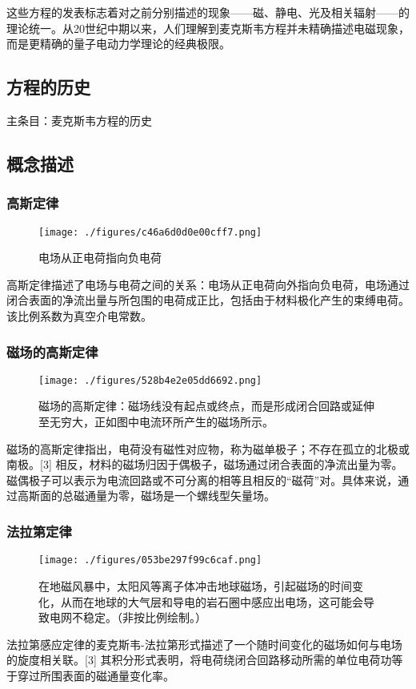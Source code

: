 这些方程的发表标志着对之前分别描述的现象——磁、静电、光及相关辐射——的理论统一。从20世纪中期以来，人们理解到麦克斯韦方程并未精确描述电磁现象，而是更精确的量子电动力学理论的经典极限。
\subsection{方程的历史}  
主条目：麦克斯韦方程的历史
\subsection{概念描述} 
\subsubsection{高斯定律} 
\begin{figure}[ht]
\centering
\texttt{[image: ./figures/c46a6d0d0e00cff7.png]}
\caption{电场从正电荷指向负电荷} \label{fig_MAXS_2}
\end{figure}
高斯定律描述了电场与电荷之间的关系：电场从正电荷向外指向负电荷，电场通过闭合表面的净流出量与所包围的电荷成正比，包括由于材料极化产生的束缚电荷。该比例系数为真空介电常数。
\subsubsection{磁场的高斯定律}
\begin{figure}[ht]
\centering
\texttt{[image: ./figures/528b4e2e05dd6692.png]}
\caption{磁场的高斯定律：磁场线没有起点或终点，而是形成闭合回路或延伸至无穷大，正如图中电流环所产生的磁场所示。} \label{fig_MAXS_3}
\end{figure}
磁场的高斯定律指出，电荷没有磁性对应物，称为磁单极子；不存在孤立的北极或南极。[3] 相反，材料的磁场归因于偶极子，磁场通过闭合表面的净流出量为零。磁偶极子可以表示为电流回路或不可分离的相等且相反的“磁荷”对。具体来说，通过高斯面的总磁通量为零，磁场是一个螺线型矢量场。
\subsubsection{法拉第定律}
\begin{figure}[ht]
\centering
\texttt{[image: ./figures/053be297f99c6caf.png]}
\caption{在地磁风暴中，太阳风等离子体冲击地球磁场，引起磁场的时间变化，从而在地球的大气层和导电的岩石圈中感应出电场，这可能会导致电网不稳定。（非按比例绘制。）} \label{fig_MAXS_4}
\end{figure}
法拉第感应定律的麦克斯韦-法拉第形式描述了一个随时间变化的磁场如何与电场的旋度相关联。[3] 其积分形式表明，将电荷绕闭合回路移动所需的单位电荷功等于穿过所围表面的磁通量变化率。

